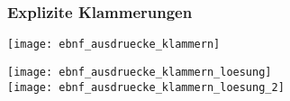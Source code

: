 \subsubsection{Explizite Klammerungen}
\begin{minipage}{0,4\linewidth}
    \texttt{[image: ebnf\_ausdruecke\_klammern]}
\end{minipage}
\begin{minipage}{0,6\linewidth}
    \texttt{[image: ebnf\_ausdruecke\_klammern\_loesung]}
    \\
    \linebreak
    \texttt{[image: ebnf\_ausdruecke\_klammern\_loesung\_2]}
\end{minipage}